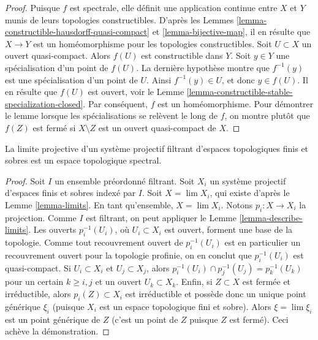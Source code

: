 \begin{proof}
Puisque $f$ est spectrale, elle définit une application continue entre $X$ et
$Y$ munis de leurs topologies constructibles. D'après les
Lemmes \ref{lemma-constructible-hausdorff-quasi-compact} et
\ref{lemma-bijective-map}, il en résulte que $X \to Y$ est un homéomorphisme
pour les topologies constructibles. Soit $U \subset X$ un ouvert
quasi-compact. Alors $f(U)$ est constructible dans $Y$. Soit $y \in Y$ une
spécialisation d'un point de $f(U)$. La dernière hypothèse montre que
$f^{-1}(y)$ est une spécialisation d'un point de $U$. Ainsi
$f^{-1}(y) \in U$, et donc $y \in f(U)$.
Il en résulte que $f(U)$ est ouvert, voir le
Lemme \ref{lemma-constructible-stable-specialization-closed}.
Par conséquent, $f$ est un homéomorphisme.
Pour démontrer le lemme lorsque les spécialisations se relèvent le long de
$f$, on montre plutôt que $f(Z)$ est fermé si $X \setminus Z$ est un ouvert
quasi-compact de $X$.
\end{proof}

\begin{lemma}
\label{lemma-directed-inverse-limit-finite-sober-spectral-spaces}
La limite projective d'un système projectif filtrant d'espaces topologiques
finis et sobres est un espace topologique spectral.
\end{lemma}

\begin{proof}
Soit $I$ un ensemble préordonné filtrant. Soit $X_i$ un système projectif
d'espaces finis et sobres indexé par $I$. Soit $X = \lim X_i$, qui existe
d'après le Lemme \ref{lemma-limits}. En tant qu'ensemble, $X = \lim X_i$.
Notons $p_i : X \to X_i$ la projection.
Comme $I$ est filtrant, on peut appliquer le
Lemme \ref{lemma-describe-limits}.
Les ouverts $p_i^{-1}(U_i)$, où $U_i \subset X_i$ est ouvert, forment une base
de la topologie. Comme tout recouvrement ouvert de $p_i^{-1}(U_i)$ est en
particulier un recouvrement ouvert pour la topologie profinie, on en conclut
que $p_i^{-1}(U_i)$ est quasi-compact. Si $U_i \subset X_i$ et
$U_j \subset X_j$, alors
$p_i^{-1}(U_i) \cap p_j^{-1}(U_j) = p_k^{-1}(U_k)$
pour un certain $k \geq i, j$ et un ouvert $U_k \subset X_k$. Enfin, si
$Z \subset X$ est fermée et irréductible, alors $p_i(Z) \subset X_i$ est
irréductible et possède donc un unique point générique $\xi_i$ (puisque $X_i$
est un espace topologique fini et sobre). Alors $\xi = \lim \xi_i$ est un
point générique de $Z$ (c'est un point de $Z$ puisque $Z$ est fermé).
Ceci achève la démonstration.
\end{proof}

